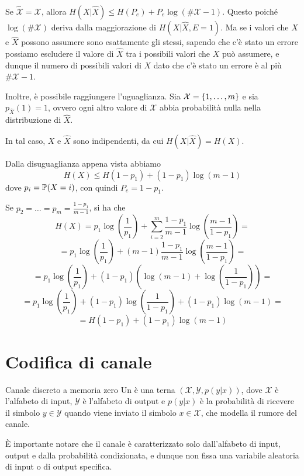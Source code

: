\begin{observation}{}
  Se \(\mathcal{\hat{X}} = \mathcal{X}\), allora \(H(X|\hat{X})\leq H(P_e)+P_e\log(\#\mathcal{X}-1)\). Questo poiché \(\log(\#\mathcal{X})\) deriva dalla maggiorazione di \(H(X|\hat{X},E=1)\). Ma se i valori che \(X\) e \(\hat{X}\) possono assumere sono esattamente gli stessi, sapendo che c'è stato un errore possiamo escludere il valore di \(\hat{X}\) tra i possibili valori che \(X\) può assumere, e dunque il numero di possibili valori di \(X\) dato che c'è stato un errore è al più \(\#\mathcal{X}-1\).

  Inoltre, è possibile raggiungere l'uguaglianza.
  Sia \(\mathcal{X} = \set{1,\ldots,m}\) e sia \(p_{\hat{X}}(1) = 1\), ovvero ogni altro valore di \(\mathcal{X}\) abbia probabilità nulla nella distribuzione di \(\hat{X}\).
  
  In tal caso, \(X\) e \(\hat{X}\) sono indipendenti, da cui \(H(X|\hat{X}) = H(X)\).

  Dalla disuguaglianza appena vista abbiamo
  \[H(X) \leq H(1-p_1)+(1-p_1)\log(m-1)\]
  dove \(p_i = \Prob(X=i)\), con quindi \(P_e = 1-p_1\).

  Se \(p_2=\ldots=p_m = \frac{1-p_1}{m-1}\), si ha che
  \[H(X) = p_1\log\left(\frac{1}{p_1}\right) + \sum_{i=2}^m \frac{1-p_1}{m-1}\log\left(\frac{m-1}{1-p_1}\right)=\]
  \[ = p_1\log\left(\frac{1}{p_1}\right) + (m-1)\frac{1-p_1}{m-1}\log\left(\frac{m-1}{1-p_1}\right) = \]
  \[ = p_1\log\left(\frac{1}{p_1}\right) + (1-p_1)\left(\log(m-1) + \log\left(\frac{1}{1-p_1}\right)\right) = \]
  \[ = p_1\log\left(\frac{1}{p_1}\right) +(1-p_1)\log\left(\frac{1}{1-p_1}\right) +(1-p_1)\log(m-1) =\]
  \[= H(1-p_1) + (1-p_1)\log(m-1)\]
\end{observation}

\section{Codifica di canale}

\begin{definition}{Canale discreto a memoria zero}
  Un  è una terna \((\mathcal{X}, \mathcal{Y}, p(y|x))\), dove \(\mathcal{X}\) è l'alfabeto di input, \(\mathcal{Y}\) è l'alfabeto di output e \(p(y|x)\) è la probabilità di ricevere il simbolo \(y\in\mathcal{Y}\) quando viene inviato il simbolo \(x\in\mathcal{X}\), che modella il rumore del canale.
\end{definition}

È importante notare che il canale è caratterizzato solo dall'alfabeto di input, output e dalla probabilità condizionata, e dunque non fissa una variabile aleatoria di input o di output specifica.

